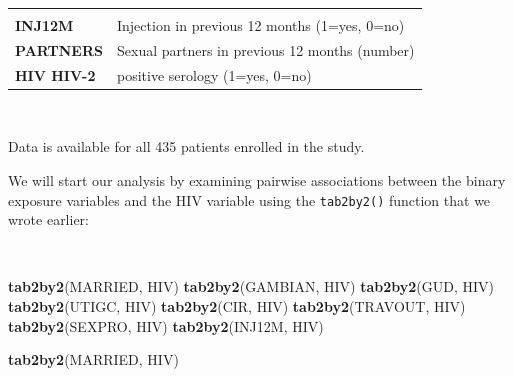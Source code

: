 \documentclass[12pt,a4paper]{book}
\newenvironment{Shaded}{\begin{snugshade}}{\end{snugshade}}
\newcommand{\KeywordTok}[1]{\textcolor[rgb]{0.13,0.29,0.53}{\textbf{#1}}}
\newcommand{\NormalTok}[1]{#1}
\theoremstyle{definition}
\theoremstyle{definition}
\theoremstyle{definition}
\theoremstyle{remark}
\begin{document}
\begin{longtable}[]{@{}ll@{}}
\begin{minipage}[t]{0.75\columnwidth}
\end{minipage}\tabularnewline
\begin{minipage}[t]{0.20\columnwidth}\raggedright
\textbf{INJ12M}\strut
\end{minipage} & \begin{minipage}[t]{0.75\columnwidth}\raggedright
Injection in previous 12 months (1=yes, 0=no)\strut
\end{minipage}\tabularnewline
\begin{minipage}[t]{0.20\columnwidth}\raggedright
\textbf{PARTNERS}\strut
\end{minipage} & \begin{minipage}[t]{0.75\columnwidth}\raggedright
Sexual partners in previous 12 months (number)\strut
\end{minipage}\tabularnewline
\begin{minipage}[t]{0.20\columnwidth}\raggedright
\textbf{HIV HIV-2}\strut
\end{minipage} & \begin{minipage}[t]{0.75\columnwidth}\raggedright
positive serology (1=yes, 0=no)\strut
\end{minipage}\tabularnewline
\bottomrule
\end{longtable}

~

Data is available for all 435 patients enrolled in the study.

We will start our analysis by examining pairwise associations between
the binary exposure variables and the HIV variable using the
\texttt{tab2by2()} function that we wrote earlier:

~

\begin{Shaded}
\begin{Highlighting}[]
\KeywordTok{tab2by2}\NormalTok{(MARRIED, HIV)}
\KeywordTok{tab2by2}\NormalTok{(GAMBIAN, HIV)}
\KeywordTok{tab2by2}\NormalTok{(GUD, HIV)}
\KeywordTok{tab2by2}\NormalTok{(UTIGC, HIV)}
\KeywordTok{tab2by2}\NormalTok{(CIR, HIV)}
\KeywordTok{tab2by2}\NormalTok{(TRAVOUT, HIV)}
\KeywordTok{tab2by2}\NormalTok{(SEXPRO, HIV)}
\KeywordTok{tab2by2}\NormalTok{(INJ12M, HIV)}
\end{Highlighting}
\end{Shaded}

\newpage

\begin{Shaded}
\begin{Highlighting}[]
\KeywordTok{tab2by2}\NormalTok{(MARRIED, HIV)}
\end{Highlighting}
\end{Shaded}
\end{document}
